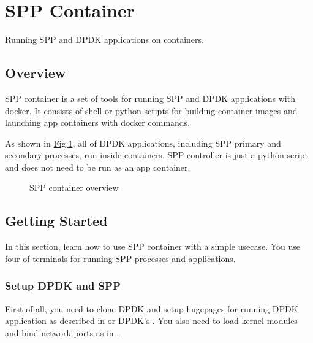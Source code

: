 \documentclass[a4paper,11pt,openany,oneside,english]{sphinxmanual}
\begin{document}
\section{SPP Container}
\label{\detokenize{tools/sppc/index:spp-container}}\label{\detokenize{tools/sppc/index:spp-container-index}}\label{\detokenize{tools/sppc/index::doc}}
Running SPP and DPDK applications on containers.


\subsection{Overview}
\label{\detokenize{tools/sppc/overview:overview}}\label{\detokenize{tools/sppc/overview:spp-container-overview}}\label{\detokenize{tools/sppc/overview::doc}}
SPP container is a set of tools for running SPP and DPDK applications
with docker.
It consists of shell or python scripts
for building container images and launching app containers
with docker commands.

As shown in \hyperref[\detokenize{tools/sppc/overview:figure-sppc-overview}]{Fig.\@ \ref{\detokenize{tools/sppc/overview:figure-sppc-overview}}}, all of
DPDK applications, including SPP primary and secondary processes,
run inside containers.
SPP controller is just a python script and does not need to be run as
an app container.

\begin{figure}[htbp]
\centering
\capstart

\noindent{}
\caption{SPP container overview}\label{\detokenize{tools/sppc/overview:id1}}\label{\detokenize{tools/sppc/overview:figure-sppc-overview}}\end{figure}


\subsection{Getting Started}
\label{\detokenize{tools/sppc/getting_started:getting-started}}\label{\detokenize{tools/sppc/getting_started:spp-container-gs}}\label{\detokenize{tools/sppc/getting_started::doc}}
In this section, learn how to use SPP container with a simple
usecase.
You use four of terminals for running SPP processes and applications.


\subsubsection{Setup DPDK and SPP}
\label{\detokenize{tools/sppc/getting_started:setup-dpdk-and-spp}}\label{\detokenize{tools/sppc/getting_started:sppc-gs-setup}}
First of all, you need to clone DPDK and setup hugepages for running
DPDK application as described in
{\hyperref[\detokenize{gsg/setup::doc}]{}}
or DPDK’s
.
You also need to load kernel modules and bind network ports as in
.
\end{document}
